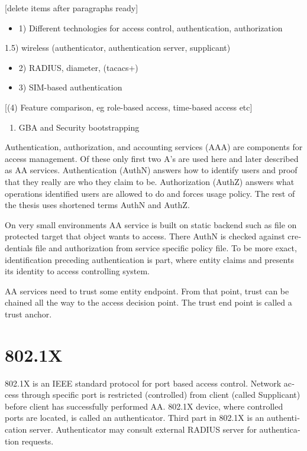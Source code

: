 \documentclass[12pt,a4paper,english]{tutthesis}
\begin{document}
\begin{otherlanguage}{english}
[delete items after paragraphs ready]
\begin{itemize}
\item 1) Different technologies for access control, authentication,
authorization
\end{itemize}
1.5) wireless (authenticator, authentication server, supplicant)
\begin{itemize}
\item 2) RADIUS, diameter, (tacacs+)
\item 3) SIM-based authentication
\end{itemize}
[(4) Feature comparison, eg role-based access, time-based access etc]
\begin{enumerate}
\item GBA and Security bootstrapping
\end{enumerate}

Authentication, authorization, and accounting services (AAA) are
components for access management. Of these only first two A's are used
here and later described as AA services. Authentication (AuthN)
answers how to identify users and proof that they really are
who they claim to be. Authorization (AuthZ) answers what operations
identified users are allowed to do and forces usage policy. The rest of the thesis uses
shortened terms AuthN and AuthZ.

On very small environments AA service is built on static backend such
as file on protected target that object wants to access. There AuthN
is checked against credentials file and authorization from service
specific policy file. 
To be more exact, identification preceding authentication is part,
where entity claims and presents its identity to 
access controlling system.

AA services need to trust some entity endpoint. From that point, trust
can be chained all the way to the access decision point. The trust end
point is called a trust anchor.


\section{802.1X}
\label{sec-2-1}

802.1X\cite{8021X} is an IEEE standard protocol for port based access
control.
 Network access through specific port is
restricted (controlled) from client (called Supplicant) before
client has successfully performed AA. 802.1X device, where controlled ports
are located, is called an authenticator. Third part in 802.1X is an
authentication server. Authenticator may consult external RADIUS
server for authentication requests. 



\end{otherlanguage}
\end{document}
